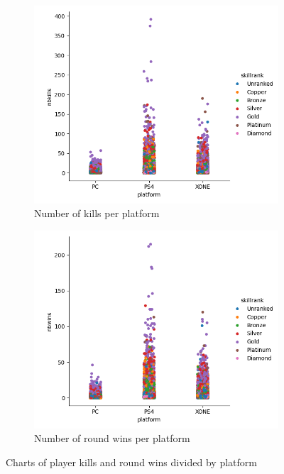 \documentclass[12pt]{article}
\begin{document}
\begin{figure}[H]
	\begin{subfigure}[h]{0.49\linewidth}
		\includegraphics[width=\textwidth]{kills-platform}
		\caption{Number of kills per platform}
	\end{subfigure}
	\hfill
	\begin{subfigure}[h]{0.49\linewidth}
		\includegraphics[width=\textwidth]{wins-platform}
		\caption{Number of round wins per platform}
	\end{subfigure}
	\caption{Charts of player kills and round wins divided by platform}
	\label{fig:wins-kills-platform}
\end{figure}
\end{document}
